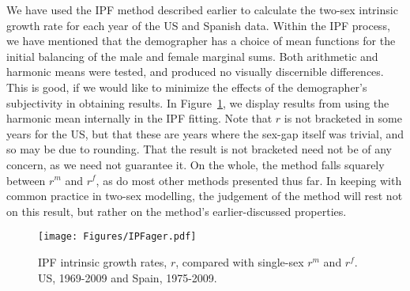 We have used the IPF method described earlier to calculate the two-sex intrinsic
growth rate for each year of the US and Spanish data. Within the IPF process, we
have mentioned that the demographer has a choice of mean functions for the
initial balancing of the male and female marginal sums. Both arithmetic and
harmonic means were tested, and produced no visually discernible differences.
This is good, if we would like to minimize the effects of the demographer's
subjectivity in obtaining results. In Figure~\ref{fig:IPFager}, we display
results from using the harmonic mean internally in the IPF fitting. Note that
$r$ is not bracketed in some years for the US, but that these are years where 
the sex-gap itself was trivial, and so may be due to
rounding. That the result is not bracketed need not be of any concern, as we
need not guarantee it. On the whole, the method falls squarely between $r^m$ and
$r^f$, as do most other methods presented thus far. In keeping with common
practice in two-sex modelling, the judgement of the method will rest not on this
result, but rather on the method's earlier-discussed properties.

\begin{figure}[ht!]
        \centering  
          \caption{IPF intrinsic growth rates, $r$, compared with
          single-sex $r^m$ and $r^f$. US, 1969-2009 and Spain, 1975-2009.}
           \texttt{[image: Figures/IPFager.pdf]}
          \label{fig:IPFager}
\end{figure}




\FloatBarrier

